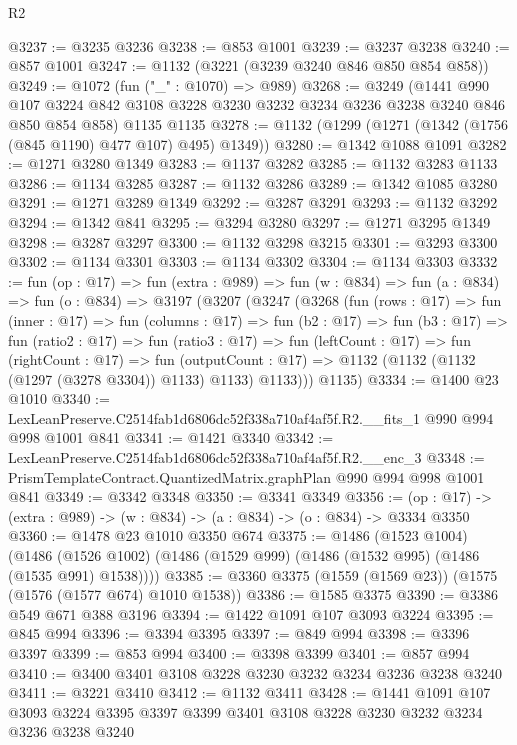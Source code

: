 \begin{lexlean}{R2}
\begin{coremodule}
@3237 := @3235 @3236
@3238 := @853 @1001
@3239 := @3237 @3238
@3240 := @857 @1001
@3247 := @1132 (@3221 (@3239 @3240 @846 @850 @854 @858))
@3249 := @1072 (fun ("_" : @1070) => @989)
@3268 := @3249
    (@1441 @990 @107 @3224 @842 @3108 @3228 @3230 @3232 @3234 @3236 @3238 @3240 @846 @850 @854 @858)
    @1135
    @1135
@3278 := @1132 (@1299 (@1271 (@1342 (@1756 (@845 @1190) @477 @107) @495) @1349))
@3280 := @1342 @1088 @1091
@3282 := @1271 @3280 @1349
@3283 := @1137 @3282
@3285 := @1132 @3283 @1133
@3286 := @1134 @3285
@3287 := @1132 @3286
@3289 := @1342 @1085 @3280
@3291 := @1271 @3289 @1349
@3292 := @3287 @3291
@3293 := @1132 @3292
@3294 := @1342 @841
@3295 := @3294 @3280
@3297 := @1271 @3295 @1349
@3298 := @3287 @3297
@3300 := @1132 @3298 @3215
@3301 := @3293 @3300
@3302 := @1134 @3301
@3303 := @1134 @3302
@3304 := @1134 @3303
@3332 := fun (op : @17) =>
  fun (extra : @989) =>
  fun (w : @834) =>
  fun (a : @834) =>
  fun (o : @834) =>
  @3197
    (@3207
      (@3247
        (@3268
          (fun (rows : @17) =>
          fun (inner : @17) =>
          fun (columns : @17) =>
          fun (b2 : @17) =>
          fun (b3 : @17) =>
          fun (ratio2 : @17) =>
          fun (ratio3 : @17) =>
          fun (leftCount : @17) =>
          fun (rightCount : @17) =>
          fun (outputCount : @17) =>
          @1132 (@1132 (@1132 (@1297 (@3278 @3304)) @1133) @1133) @1133)))
      @1135)
@3334 := @1400 @23 @1010
@3340 := LexLeanPreserve.C2514fab1d6806dc52f338a710af4af5f.R2.__fits_1 @990 @994 @998 @1001 @841
@3341 := @1421 @3340
@3342 := LexLeanPreserve.C2514fab1d6806dc52f338a710af4af5f.R2.__enc_3
@3348 := PrismTemplateContract.QuantizedMatrix.graphPlan @990 @994 @998 @1001 @841
@3349 := @3342 @3348
@3350 := @3341 @3349
@3356 := (op : @17) -> (extra : @989) -> (w : @834) -> (a : @834) -> (o : @834) -> @3334 @3350
@3360 := @1478 @23 @1010 @3350 @674
@3375 := @1486
    (@1523 @1004)
    (@1486 (@1526 @1002) (@1486 (@1529 @999) (@1486 (@1532 @995) (@1486 (@1535 @991) @1538))))
@3385 := @3360 @3375 (@1559 (@1569 @23)) (@1575 (@1576 (@1577 @674) @1010 @1538))
@3386 := @1585 @3375
@3390 := @3386 @549 @671 @388 @3196
@3394 := @1422 @1091 @107 @3093 @3224
@3395 := @845 @994
@3396 := @3394 @3395
@3397 := @849 @994
@3398 := @3396 @3397
@3399 := @853 @994
@3400 := @3398 @3399
@3401 := @857 @994
@3410 := @3400 @3401 @3108 @3228 @3230 @3232 @3234 @3236 @3238 @3240
@3411 := @3221 @3410
@3412 := @1132 @3411
@3428 := @1441
    @1091
    @107
    @3093
    @3224
    @3395
    @3397
    @3399
    @3401
    @3108
    @3228
    @3230
    @3232
    @3234
    @3236
    @3238
    @3240

\end{coremodule}
\end{lexlean}
